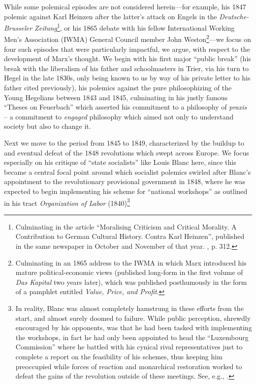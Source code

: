 While some polemical episodes are not considered herein---for example, his 1847 polemic against Karl Heinzen after the latter's attack on Engels in the \textit{Deutsche-Brusseler Zeitung}\footnote{Culminating in the article ``Moralising Criticism and Critical Morality. A Contribution to German Cultural History. Contra Karl Heinzen'', published in the same newspaper in October and November of that year. , p. 312.}, or his 1865 debate with his fellow International Working Men's Association (IWMA) General Council member John Weston\footnote{Culminating in an 1865 address to the IWMA in which Marx introduced his mature political-economic views (published long-form in the first volume of \textit{Das Kapital} two years later), which was published posthumously in the form of a pamphlet entitled \textit{Value, Price, and Profit}. }---we focus on four such episodes that were particularly impactful, we argue, with respect to the development of Marx's thought. We begin with his first major ``public break'' (his break with the liberalism of his father and schoolmasters in Trier, via his turn to Hegel in the late 1830s, only being known to us by way of his private letter to his father cited previously), his polemics against the pure philosophizing of the Young Hegelians between 1843 and 1845, culminating in his justly famous ``Theses on Feuerbach'' which asserted his commitment to a philosophy of \textit{praxis} -- a commitment to \textit{engaged} philosophy which aimed not only to understand society but also to change it.

Next we move to the period from 1845 to 1849, characterized by the buildup to and eventual defeat of the 1848 revolutions which swept across Europe. We focus especially on his critique of ``state socialists'' like Louis Blanc here, since this became a central focal point around which socialist polemics swirled after Blanc's appointment to the revolutionary provisional government in 1848, where he was expected to begin implementing his scheme for ``national workshops'' as outlined in his tract \textit{Organization of Labor} (1840)\footnote{In reality, Blanc was almost completely hamstrung in these efforts from the start, and almost surely doomed to failure. While public perception, shrewdly encouraged by his opponents, was that he had been tasked with implementing the workshops, in fact he had only been appointed to head the ``Luxembourg Commission'' where he battled with his cynical rival representatives just to complete a report on the feasibility of his schemes, thus keeping him preoccupied while forces of reaction and monarchical restoration worked to defeat the gains of the revolution outside of these meetings. See, e.g., \cite{agulhon_republican_1983}.}